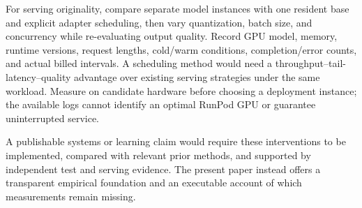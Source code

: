 For serving originality, compare separate model instances with one resident base and explicit adapter scheduling, then vary quantization, batch size, and concurrency while re-evaluating output quality. Record GPU model, memory, runtime versions, request lengths, cold/warm conditions, completion/error counts, and actual billed intervals. A scheduling method would need a throughput--tail-latency--quality advantage over existing serving strategies under the same workload. Measure on candidate hardware before choosing a deployment instance; the available logs cannot identify an optimal RunPod GPU or guarantee uninterrupted service.

A publishable systems or learning claim would require these interventions to be implemented, compared with relevant prior methods, and supported by independent test and serving evidence. The present paper instead offers a transparent empirical foundation and an executable account of which measurements remain missing.
